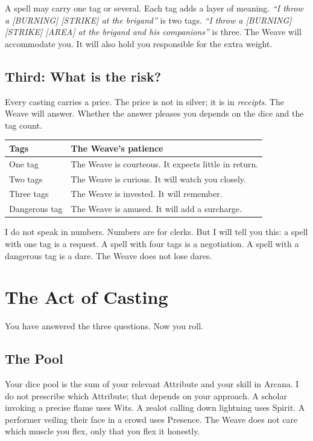 A spell may carry one tag or several. Each tag adds a layer of meaning. \emph{``I throw a [BURNING] [STRIKE] at the brigand''} is two tags. \emph{``I throw a [BURNING] [STRIKE] [AREA] at the brigand and his companions''} is three. The Weave will accommodate you. It will also hold you responsible for the extra weight.

\subsection{Third: What is the risk?}

Every casting carries a price. The price is not in silver; it is in \emph{receipts}. The Weave will answer. Whether the answer pleases you depends on the dice and the tag count.

\medskip
\noindent
\begin{tabular}{ll}
\textbf{Tags} & \textbf{The Weave's patience} \\
\midrule
One tag & The Weave is courteous. It expects little in return. \\
Two tags & The Weave is curious. It will watch you closely. \\
Three tags & The Weave is invested. It will remember. \\
Dangerous tag & The Weave is amused. It will add a surcharge. \\
\end{tabular}
\medskip

I do not speak in numbers. Numbers are for clerks. But I will tell you this: a spell with one tag is a request. A spell with four tags is a negotiation. A spell with a dangerous tag is a dare. The Weave does not lose dares.

\section{The Act of Casting}

You have answered the three questions. Now you roll.

\subsection{The Pool}

Your dice pool is the sum of your relevant Attribute and your skill in Arcana. I do not prescribe which Attribute; that depends on your approach. A scholar invoking a precise flame uses Wits. A zealot calling down lightning uses Spirit. A performer veiling their face in a crowd uses Presence. The Weave does not care which muscle you flex, only that you flex it honestly.

